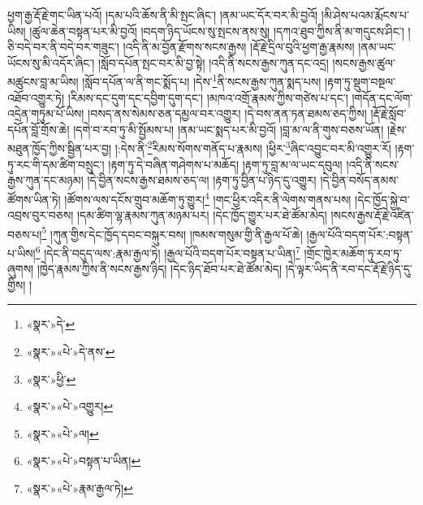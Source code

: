 ཕྱག་རྒྱ་རྡོ་རྗེ་གང་ཡིན་པའོ། །དམ་པའི་ཆོས་ནི་མི་སྤང་ཞིང་། །ནམ་ཡང་དོར་བར་མི་བྱའོ། །མི་ཤེས་པའམ་རྨོངས་པ་ཡིས། །ཚུལ་ཆེན་བསྟན་པར་མི་བྱའོ། །བདག་ཉིད་ཡོངས་སུ་སྤངས་ནས་སུ། །དཀའ་ཐུབ་ཀྱིས་ནི་མ་གདུངས་ཤིང་། །ཅི་བདེ་བར་ནི་བདེ་བར་གཟུང་། །འདི་ནི་མ་བྱོན་རྫོགས་སངས་རྒྱས། །རྡོ་རྗེ་དྲིལ་བུའི་ཕྱག་རྒྱ་རྣམས། །ནམ་ཡང་ཡོངས་སུ་མི་འདོར་ཞིང་། །སློབ་དཔོན་སྤང་བར་མི་བྱ་སྟེ། །འདི་ནི་སངས་རྒྱས་ཀུན་དང་འདྲ། །སངས་རྒྱས་ཚུལ་མཚུངས་བླ་མ་ཡིས། །སློབ་དཔོན་ལ་ནི་གང་སྨོད་པ། །དེས་\footnote{«སྣར་»དེ་}ནི་སངས་རྒྱས་ཀུན་སྨད་པས། །རྟག་ཏུ་སྡུག་བསྔལ་འཐོབ་འགྱུར་ཏེ། །རིམས་དང་དུག་དང་དབྱིག་དུག་དང་། །མཁའ་འགྲོ་རྣམས་ཀྱིས་གཙེས་པ་དང་། །གདོན་དང་ལོག་འདྲེན་གཏུམ་པོ་ཡིས། །བསད་ནས་སེམས་ཅན་དམྱལ་བར་འགྱུར། །དེ་བས་ནན་ཏན་ཐམས་ཅད་ཀྱིས། །རྡོ་རྗེ་སློབ་དཔོན་བློ་གྲོས་ཆེ། །དགེ་བ་རབ་ཏུ་མི་སྤྱོམས་པ། །ནམ་ཡང་སྨད་པར་མི་བྱའོ། །བླ་མ་ལ་ནི་གུས་བཅས་ཡོན། །རྗེས་མཐུན་ཁྱོད་ཀྱིས་སྦྱིན་པར་བྱ། །:དེས་ནི་\footnote{«སྣར་»«པེ་»དེ་ནས་}རིམས་སོགས་གནོད་པ་རྣམས། །ཕྱིར་\footnote{«སྣར་»ཕྱི་}ཞིང་འབྱུང་བར་མི་འགྱུར་རོ། །རྟག་ཏུ་རང་གི་དམ་ཚིག་བསྲུང་། །རྟག་ཏུ་དེ་བཞིན་གཤེགས་པ་མཆོད། །རྟག་ཏུ་བླ་མ་ལ་ཡང་དབུལ། །འདི་ནི་སངས་རྒྱས་ཀུན་དང་མཉམ། །དེ་བྱིན་སངས་རྒྱས་ཐམས་ཅད་ལ། །རྟག་ཏུ་བྱིན་པ་ཉིད་དུ་འགྱུར། །དེ་བྱིན་བསོད་ནམས་ཚོགས་ཡིན་ཏེ། །ཚོགས་ལས་དངོས་གྲུབ་མཆོག་ཏུ་གྱུར།\footnote{«སྣར་»«པེ་»འགྱུར།} །གང་ཕྱིར་འདིར་ནི་ལེགས་གནས་པས། །དེང་ཁྱོད་སྐྱེ་བ་འབྲས་བུར་བཅས། །དམ་ཚིག་ལྷ་རྣམས་ཀུན་མཉམ་པར། །དེང་ཁྱོད་གྱུར་པར་ཐེ་ཚོམ་མེད། །སངས་རྒྱས་རྡོ་རྗེ་འཛིན་བཅས་པ།\footnote{«སྣར་»«པེ་»ལ།} །ཀུན་གྱིས་དེང་ཁྱོད་དབང་བསྐུར་བས། །ཁམས་གསུམ་གྱི་ནི་རྒྱལ་པོ་ཆེ། །རྒྱལ་པོའི་བདག་པོར་:བསྟན་པ་ཡིས།\footnote{«སྣར་»«པེ་»བསྟན་པ་ཡིན།} །དེང་ནི་བདུད་ལས་:རྣམ་རྒྱལ་ཏེ། །རྒྱལ་པོའི་བདག་པོར་བསྟན་པ་ཡིན།\footnote{«སྣར་»«པེ་»རྣམ་རྒྱལ་ཏེ།} །གྲོང་ཁྱེར་མཆོག་ཏུ་རབ་ཏུ་ཞུགས། །ཁྱེད་རྣམས་ཀྱིས་ནི་སངས་རྒྱས་ཉིད། །དེང་ཉིད་ཐོབ་པར་ཐེ་ཚོམ་མེད། །དེ་ལྟར་ཡིད་ནི་རབ་དང་རྡོ་རྗེ་ཉིད་དུ་གྱིས། །
